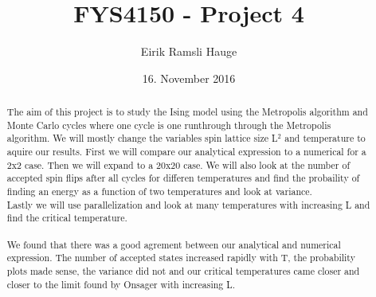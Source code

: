 \documentclass{article}
\title{FYS4150 - Project 4}
\author{Eirik Ramsli Hauge}
\date{16. November 2016}
\begin{document}
\maketitle
\begin{abstract}
The aim of this project is to study the Ising model using the Metropolis algorithm and Monte Carlo cycles where one cycle is one runthrough through the Metropolis algorithm. We will mostly change the variables spin lattice size L$^2$ and temperature to aquire our results. First we will compare our analytical expression to a numerical for a 2x2 case. Then we will expand to a 20x20 case. We will also look at the number of accepted spin flips after all cycles for differen temperatures and find the probaility of finding an energy as a function of two temperatures and look at variance. \\
Lastly we will use parallelization and look at many temperatures with increasing L and find the critical temperature. \\ \\
We found that there was a good agrement between our analytical and numerical expression. The number of accepted states increased rapidly with T, the probability plots made sense, the variance did not and our critical temperatures came closer and closer to the limit found by Onsager with increasing L.
\end{abstract}
\end{document}
